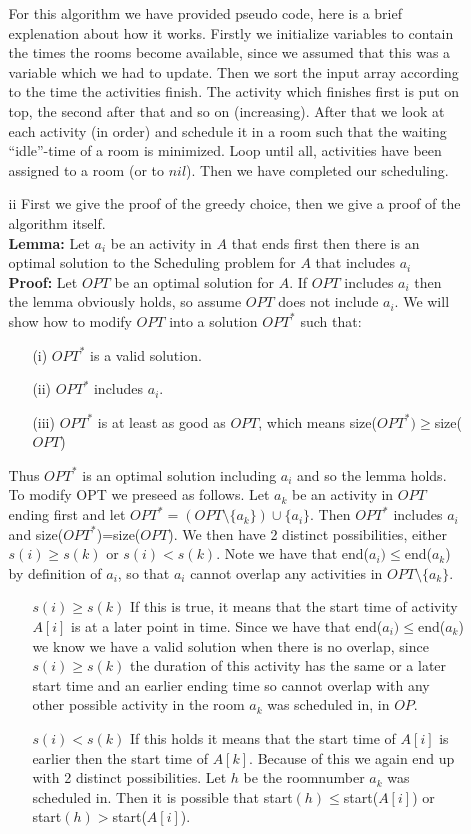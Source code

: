 \documentclass{article}
\begin{document}
\begin{itemize}
\begin{itemize}
For this algorithm we have provided pseudo code, here is a brief explenation about how it works. Firstly we initialize variables to contain the times the rooms become available, since we assumed that this was a variable which we had to update. Then we sort the input array according to the time the activities finish. The activity which finishes first is put on top, the second after that and so on (increasing). After that we look at each activity (in order) and schedule it in a room such that the waiting ``idle''-time of a room is minimized. Loop until all, activities have been assigned to a room (or to $nil$). Then we have completed our scheduling.

\item[ii] First we give the proof of the greedy choice, then we give a proof of the algorithm itself.\\
\textbf{Lemma:} Let $a_i$ be an activity in $A$ that ends first then there is an optimal solution to the Scheduling problem for $A$ that includes $a_i$ \\

\textbf{Proof:} Let $OPT$ be an optimal solution for $A$. If $OPT$ includes $a_i$ then the lemma obviously holds, so assume $OPT$ does not include $a_i$. We will show how to modify $OPT$ into a solution $OPT^*$ such that:
\begin{itemize}
\item[(i)] $OPT^*$ is a valid solution.
\item[(ii)] $OPT^*$ includes $a_i$.
\item[(iii)] $OPT^*$ is at least as good as $OPT$, which means size($OPT^*)\ge $size($OPT$)
\end{itemize}

Thus $OPT^*$ is an optimal solution including $a_i$ and so the lemma holds. To modify OPT we preseed as follows. Let $a_k$ be an activity in $OPT$ ending first and let $OPT^*=(OPT \setminus \{a_k\}) \cup \{a_i\}$. Then $OPT^*$ includes $a_i$ and size($OPT^*$)=size($OPT$). 
We then have 2 distinct possibilities, either $s(i) \ge s(k)$ or $s(i) < s(k)$. Note we have that end($a_i) \le $end($a_k$) by definition of $a_i$, so that $a_i$ cannot overlap any activities in $OPT \setminus \{a_k\}$.

\begin{itemize}
\item[$s(i)\ge s(k)$] If this is true, it means that the start time of activity $A[i]$ is at a later point in time. Since we have that end($a_i) \le $end($a_k$) we know we have a valid solution when there is no overlap, since $s(i) \ge s(k)$ the duration of this activity has the same or a later start time and an earlier ending time so cannot overlap with any other possible activity in the room $a_k$ was scheduled in, in $OP$.
\item[$s(i) < s(k)$] If this holds it means that the start time of $A[i]$ is earlier then the start time of $A[k]$. Because of this we again end up with 2 distinct possibilities. Let $h$ be the roomnumber $a_k$ was scheduled in. Then it is possible that start$(h)\le$start($A[i]$) or start$(h) > $start($A[i]$).


\end{itemize}
\end{itemize}
\end{itemize}
\end{document}
